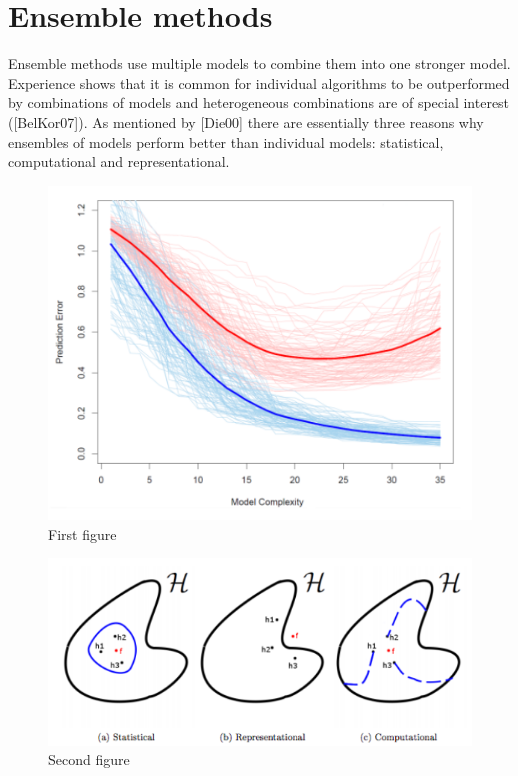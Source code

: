 \documentclass[a4paper,12pt,times,numbered,print,index]{Classes/PhDThesisPSnPDF}
\begin{document}
\section{Ensemble methods}

Ensemble methods use multiple models to combine them into one stronger model. Experience
shows that it is common for individual algorithms to be outperformed by combinations of models and heterogeneous combinations are of special interest ([BelKor07]). As mentioned
by [Die00] there are essentially three reasons why ensembles of models perform better than
individual models: statistical, computational and representational.

\begin{figure}
\centering    
\includegraphics[width=1.0\textwidth]{1}
\caption[1]{First figure}
\label{fig:1}
\end{figure}

\begin{figure}
\centering    
\includegraphics[width=1.0\textwidth]{2}
\caption[2]{Second figure}
\label{fig:2}
\end{figure}
\end{document}
